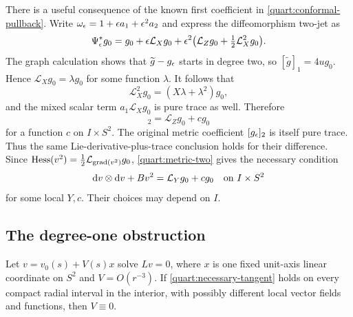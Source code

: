 There is a useful consequence of the known first coefficient in
\eqref{quart:conformal-pullback}.  Write
\(\omega_\epsilon=1+\epsilon a_1+\epsilon^2a_2\) and express the
diffeomorphism two-jet as
\[
 \Psi_\epsilon^*g_0
  =g_0+\epsilon\mathcal L_Xg_0
      +\epsilon^2\bigl(\mathcal L_Zg_0
                      +\tfrac12\mathcal L_X^2g_0\bigr).
\]
The graph calculation shows that \(\widetilde g-g_\epsilon\) starts
in degree two, so \([\widetilde g]_1=4ug_0\).  Hence
\(\mathcal L_Xg_0=\lambda g_0\) for some function \(\lambda\).
It follows that
\[
 \mathcal L_X^2g_0=(X\lambda+\lambda^2)g_0,
\]
and the mixed scalar term \(a_1\mathcal L_Xg_0\) is pure trace as
well.  Therefore
\begin{equation}
 [\widetilde g]_2=\mathcal L_Zg_0+c g_0
 \label{quart:second-tangent}
\end{equation}
for a function \(c\) on \(I\times S^2\).  The original metric
coefficient \([g_\epsilon]_2\) is itself pure trace.  Thus the same
Lie-derivative-plus-trace conclusion holds for their difference.
Since \(\operatorname{Hess}(v^2)=\frac12\mathcal L_{\operatorname{grad}(v^2)}g_0\),
\eqref{quart:metric-two} gives the necessary condition
\begin{equation}
 \mathrm{d} v\otimes\mathrm{d} v+Bv^2=\mathcal L_Yg_0+c g_0
 \quad\hbox{on }I\times S^2
 \label{quart:necessary-tangent}
\end{equation}
for some local \(Y,c\).  Their choices may depend on \(I\).

\subsection{The degree-one obstruction}\label{quart:obstruction-section}

\begin{lemma}
\label{lem:dipole-obstruction}
Let \(v=v_0(s)+V(s)x\) solve \(Lv=0\), where \(x\) is one fixed
unit-axis linear coordinate on \(S^2\) and \(V=O(r^{-3})\).
If \eqref{quart:necessary-tangent} holds on every compact radial
interval in the interior, with possibly different local vector fields
and functions, then \(V\equiv0\).
\end{lemma}

